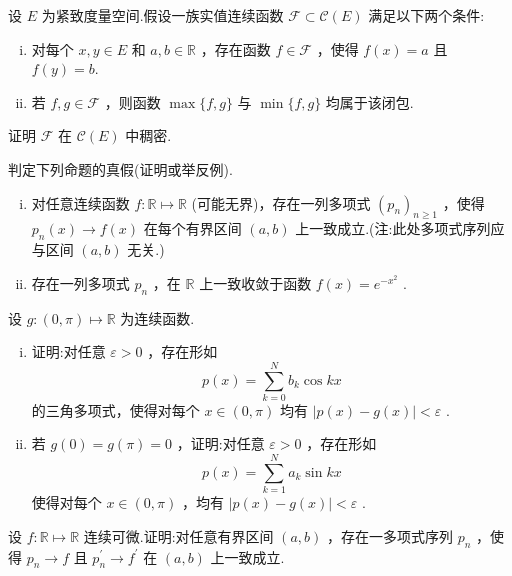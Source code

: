 \begin{rbhw}[index=1]
设 $E$ 为紧致度量空间.假设一族实值连续函数 $\mathcal{F} \subset  \mathcal{C}\left( E\right)$ 满足以下两个条件:
\begin{enumerate}[(i)]
\item 对每个 $x,y \in  E$ 和 $a,b \in  \mathbb{R}$ ，存在函数 $f \in  \mathcal{F}$ ，使得 $f\left( x\right)  = a$ 且 $f\left( y\right)  = b$.
\item 若 $f,g \in  \mathcal{F}$ ，则函数 $\max \{ f,g\}$ 与 $\min \{ f,g\}$ 均属于该闭包.
\end{enumerate}
证明 $\mathcal{F}$ 在 $\mathcal{C}\left( E\right)$ 中稠密.
\end{rbhw}

\begin{rbhw}
判定下列命题的真假(证明或举反例).
\begin{enumerate}[(i)]
\item 对任意连续函数 $f : \mathbb{R} \mapsto  \mathbb{R}$ (可能无界)，存在一列多项式 ${\left( {p}_{n}\right) }_{n \geq  1}$ ，使得 ${p}_{n}\left( x\right)  \rightarrow  f\left( x\right)$ 在每个有界区间 $\left(  {a,b}\right)$ 上一致成立.(注:此处多项式序列应与区间 $\left(  {a,b}\right)$ 无关.)
\item 存在一列多项式 ${p}_{n}$ ，在 $\mathbb{R}$ 上一致收敛于函数 $f\left( x\right)  = {e}^{-{x}^{2}}$ .
\end{enumerate}
\end{rbhw}

\begin{rbhw}
设 $g : \left(  {0,\pi }\right)   \mapsto  \mathbb{R}$ 为连续函数.
\begin{enumerate}[(i)]
\item 证明:对任意 $\varepsilon  > 0$ ，存在形如
\[
p\left( x\right)  = \mathop{\sum }\limits_{{k = 0}}^{N}{b}_{k}\cos {kx}
\]
的三角多项式，使得对每个 $x \in  \left(  {0,\pi }\right)$ 均有 $\left| {p\left( x\right)  - g\left( x\right) }\right|  < \varepsilon$ .
\item 若 $g\left( 0\right)  = g\left( \pi \right)  = 0$ ，证明:对任意 $\varepsilon  > 0$ ，存在形如
\[
p\left( x\right)  = \mathop{\sum }\limits_{{k = 1}}^{N}{a}_{k}\sin {kx}
\]
使得对每个 $x \in  \left(  {0,\pi }\right)$ ，均有 $\left| {p\left( x\right)  - g\left( x\right) }\right|  < \varepsilon$ .
\end{enumerate}
\end{rbhw}

\begin{rbhw}
设 $f : \mathbb{R} \mapsto  \mathbb{R}$ 连续可微.证明:对任意有界区间 $\left(  {a,b}\right)$ ，存在一多项式序列 ${p}_{n}$ ，使得 ${p}_{n} \rightarrow  f$ 且 ${p}_{n}^{\prime } \rightarrow  {f}^{\prime }$ 在 $\left(  {a,b}\right)$ 上一致成立.
\end{rbhw}

